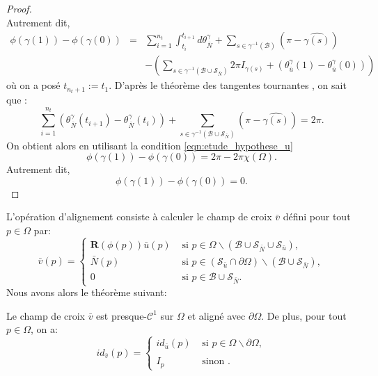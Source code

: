 \begin{proof}
$$    $$
    Autrement dit,
    $$
    \begin{array}{lcl}
        \phi(\gamma(1))-\phi(\gamma(0))&=&\displaystyle\sum_{i=1}^{n_t}\int_{t_i}^{t_{i+1}}d\theta_{\bar{N}}^\gamma+\sum_{s\in\gamma^{-1}(\mathcal{B})}\left(\pi-\widehat{\gamma(s)}\right)\\[0.7cm]
        &&-\displaystyle\left(\sum_{s\in\gamma^{-1}(\mathcal{B}\cup\mathcal{S}_{\bar{N}})}2\pi I_{\gamma(s)}+(\theta_{\bar{u}}^\gamma(1)-\theta_{\bar{u}}^\gamma(0))\right)
    \end{array}
    $$
    où on a posé $t_{n_t+1}:=t_1$. D'après le théorème des tangentes tournantes \cite{hopf1935drehung, rotskoff2010gauss}, on sait que :
    $$
    \displaystyle\sum_{i=1}^{n_t}\left(\theta_{\bar{N}}^\gamma(t_{i+1})-\theta_{\bar{N}}^\gamma(t_i)\right)+\sum_{s\in\gamma^{-1}(\mathcal{B}\cup\mathcal{S}_{\bar{N}})}\left(\pi-\widehat{\gamma(s)}\right)=2\pi.
    $$
    On obtient alors en utilisant la condition \eqref{eqn:etude_hypothese_u}
    $$
    \phi(\gamma(1))-\phi(\gamma(0))=2\pi-2\pi\chi(\Omega).
    $$
    Autrement dit,
    $$
    \phi(\gamma(1))-\phi(\gamma(0))=0.
    $$
\end{proof}
L'opération d'alignement consiste à calculer le champ de croix $\bar{v}$ défini pour tout $p\in\Omega$ par:
\begin{equation}
\bar{v}(p)=
\left\{
\begin{array}{ll}
\mathbf{R}(\phi(p))\bar{u}(p) & \mbox{ si } p\in\Omega\backslash(\mathcal{B}\cup\mathcal{S}_{\bar{N}}\cup\mathcal{S}_{\bar{u}}),\\[0.5cm]
\bar{N}(p) & \mbox{ si } p\in(\mathcal{S}_{\bar{u}}\cap\partial\Omega)\backslash(\mathcal{B}\cup\mathcal{S}_{\bar{N}}),\\[0.5cm]
0 & \mbox{ si } p\in\mathcal{B}\cup\mathcal{S}_{\bar{N}}.
\end{array}
\right.
\label{eqn:etude_def_v}
\end{equation}
Nous avons alors le théorème suivant:
\begin{theorem}
\label{thm:theorem2}
Le champ de croix $\bar{v}$ est presque-$\mathcal{C}^1$ sur $\Omega$ et aligné avec $\partial\Omega$. De plus, pour tout $p\in\Omega$, on a:
\begin{equation}
id_{\bar{v}}(p)=
\left\{
\begin{array}{ll}
    id_{\bar{u}}(p) & \mbox{ si } p\in\Omega\backslash\partial\Omega,\\\\
    I_p & \mbox{ sinon }.
\end{array}
\right.
\end{equation}
\end{theorem}

